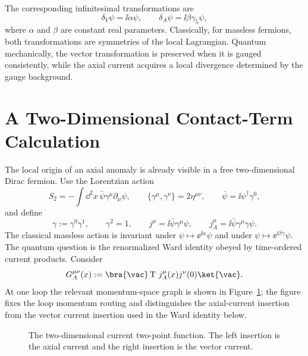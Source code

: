 The corresponding infinitesimal transformations are
\[
  \delta_V\psi=\ii\alpha\psi,\qquad
  \delta_A\psi=\ii\beta\gamma_5\psi,
\]
where \(\alpha\) and \(\beta\) are constant real parameters.  Classically, for
massless fermions, both transformations are symmetries of the local
Lagrangian.  Quantum mechanically, the vector transformation is preserved
when it is gauged consistently, while the axial current acquires a local
divergence determined by the gauge background.

\section{A Two-Dimensional Contact-Term Calculation}

The local origin of an axial anomaly is already visible in a free
two-dimensional Dirac fermion.  Use the Lorentzian action
\[
  S_2=-\int\dd^2x\,\bar\psi\gamma^\mu\partial_\mu\psi,
  \qquad
  \{\gamma^\mu,\gamma^\nu\}=2\eta^{\mu\nu},
  \qquad
  \bar\psi=\ii\psi^\dagger\gamma^0,
\]
and define
\[
  \gamma:=\gamma^0\gamma^1,
  \qquad
  \gamma^2=1,
  \qquad
  j^\mu=\ii\bar\psi\gamma^\mu\psi,
  \qquad
  j_A^\mu=\ii\bar\psi\gamma^\mu\gamma\psi .
\]
The classical massless action is invariant under
\(\psi\mapsto \ee^{\ii\alpha}\psi\) and under
\(\psi\mapsto\ee^{\ii\beta\gamma}\psi\).  The quantum question is the
renormalized Ward identity obeyed by time-ordered current products.  Consider
\[
  G_A^{\mu\nu}(x)
  :=
  \bra{\vac}
  \operatorname T\,j_A^\mu(x)j^\nu(0)
  \ket{\vac} .
\]
At one loop the relevant momentum-space graph is shown in
Figure~\ref{fig:two-dimensional-axial-vector-loop}; the figure fixes the loop
momentum routing and distinguishes the axial-current insertion from the vector
current insertion used in the Ward identity below.
\begin{figure}[H]
  \centering
  \caption{The two-dimensional current two-point function.  The left insertion
  is the axial current and the right insertion is the vector current.}
  \label{fig:two-dimensional-axial-vector-loop}
\end{figure}

